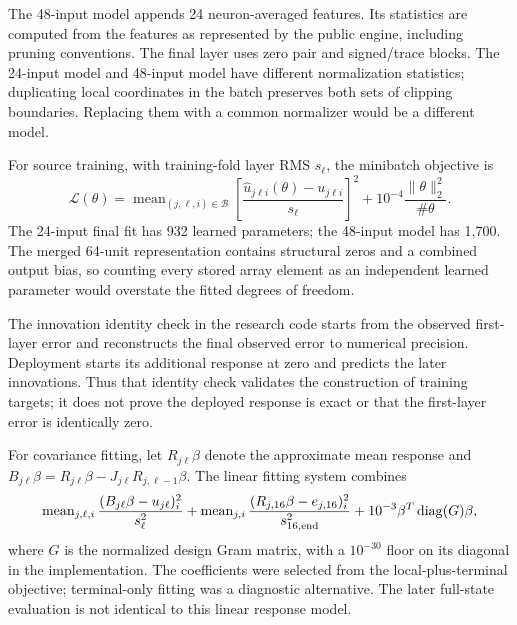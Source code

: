 The 48-input model appends 24 neuron-averaged features. Its statistics are
computed from the features as represented by the public engine, including
pruning conventions. The final layer uses zero pair and signed/trace blocks.
The 24-input model and 48-input model have different normalization statistics;
duplicating local coordinates in the batch preserves both sets of clipping
boundaries. Replacing them with a common normalizer would be a different model.

For source training, with training-fold layer RMS \(s_\ell\), the minibatch
objective is
\begin{equation}
 \mathcal L(\theta)=\operatorname{mean}_{(j,\ell,i)\in\mathcal B}
 \left[\frac{\widehat u_{j\ell i}(\theta)-u_{j\ell i}}{s_\ell}\right]^2
 +10^{-4}\frac{\|\theta\|_2^2}{\#\theta}.
\end{equation}
The 24-input final fit has 932 learned parameters; the 48-input model has
1,700. The merged 64-unit representation contains structural zeros and a
combined output bias, so counting every stored array element as an independent
learned parameter would overstate the fitted degrees of freedom.

The innovation identity check in the research code starts from the observed
first-layer error and reconstructs the final observed error to numerical
precision. Deployment starts its additional response at zero and predicts
the later innovations. Thus that identity check validates the construction of
training targets; it does not prove the deployed response is exact or that
the first-layer error is identically zero.

For covariance fitting, let \(R_{j\ell}\beta\) denote the approximate mean
response and \(B_{j\ell}\beta=R_{j\ell}\beta-J_{j\ell}R_{j,\ell-1}\beta\).
The linear fitting system combines
\begin{equation}
 \operatorname{mean}_{j,\ell,i}
 \frac{(B_{j\ell}\beta-u_{j\ell})_i^2}{s_\ell^2}
 +\operatorname{mean}_{j,i}
 \frac{(R_{j,16}\beta-e_{j,16})_i^2}{s_{16,\rm end}^2}
 +10^{-3}\beta^T\operatorname{diag}(G)\beta,
\end{equation}
where \(G\) is the normalized design Gram matrix, with a \(10^{-30}\)
floor on its diagonal in the implementation. The coefficients were selected
from the local-plus-terminal objective; terminal-only fitting was a diagnostic
alternative. The later full-state evaluation is not identical to this linear
response model.

\clearpage
